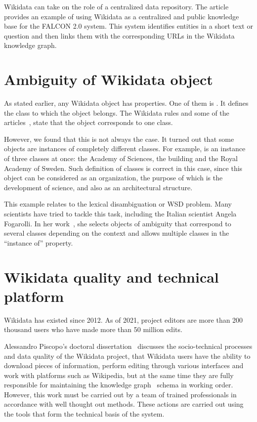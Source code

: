 Wikidata can take on the role of a centralized data repository. The article~ provides an example of using Wikidata as a centralized and public knowledge base for the FALCON 2.0 system. This system identifies entities in a short text or question and then links them with the corresponding URLs in the Wikidata knowledge graph.

\section{Ambiguity of Wikidata object}
As stated earlier, any Wikidata object has properties. One of them is . It defines the class to which the object belongs. The Wikidata rules and some of the articles~, state that the object corresponds to one class.

However, we found that this is not always the case. It turned out that some objects are instances of completely different classes. For example,  is an instance of three classes at once: the Academy of Sciences, the building and the Royal Academy of Sweden. Such definition of classes is correct in this case, since this object can be considered as an organization, the purpose of which is the development of science, and also as an architectural structure.

This example relates to the lexical disambiguation or WSD problem. Many scientists have tried to tackle this task, including the Italian scientist Angela Fogarolli. In her work~, she selects objects of ambiguity that correspond to several classes depending on the context and allows multiple classes in the ``instance of'' property.

\section{Wikidata quality and technical platform}
Wikidata has existed since 2012. As of 2021, project editors are more than 200 thousand users who have made more than 50 million edits.

Alessandro Piscopo's doctoral dissertation~ discusses the socio-technical processes and data quality of the Wikidata project, that Wikidata users have the ability to download pieces of information, perform editing through various interfaces and work with platforms such as Wikipedia, but at the same time they are fully responsible for maintaining the knowledge graph~ schema in working order. However, this work must be carried out by a team of trained professionals in accordance with well thought out methods. These actions are carried out using the tools that form the technical basis of the system.

